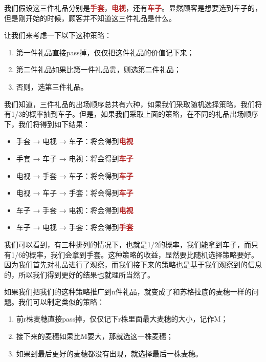 \documentclass[12pt, letterpaper]{ctexrep}
\begin{document}
我们假设这三件礼品分别是\textbf{\textcolor{Firebrick}{手套}}，\textbf{\textcolor{Firebrick}{电视}}，还有\textbf{\textcolor{Firebrick}{车子}}。显然顾客是想要选到车子的，但是刚开始的时候，顾客并不知道这三件礼品是什么。

让我们来考虑一下以下这种策略：

\begin{enumerate}
\item{ 第一件礼品直接pass掉，仅仅把这件礼品的价值记下来； }
\item{ 第二件礼品如果比第一件礼品贵，则选第二件礼品； }
\item{ 否则，选第三件礼品。 }
\end{enumerate}


我们知道，三件礼品的出场顺序总共有六种，如果我们采取随机选择策略，我们将有1/3的概率抽到车子。但是，如果我们采取上面的策略，在不同的礼品出场顺序下，我们将得到如下结果：


\begin{itemize}
\item{ 手套 → 电视 → 车子：将会得到\textbf{\textcolor{Firebrick}{电视}} }
\item{ 手套 → 车子 → 电视：将会得到\textbf{\textcolor{Firebrick}{车子}} }
\item{ 电视 → 手套 → 车子：将会得到\textbf{\textcolor{Firebrick}{车子}} }
\item{ 电视 → 车子 → 手套：将会得到\textbf{\textcolor{Firebrick}{车子}} }
\item{ 车子 → 手套 → 电视：将会得到\textbf{\textcolor{Firebrick}{电视}} }
\item{ 车子 → 电视 → 手套：将会得到\textbf{\textcolor{Firebrick}{手套}} }
\end{itemize}


我们可以看到，有三种排列的情况下，也就是1/2的概率，我们能拿到车子，而只有1/6的概率，我们会拿到手套。这种策略的收益，显然要比随机选择策略要好。因为我们首先对礼品进行了观察，而我们接下来的策略也是基于我们观察到的信息的，所以我们得到更好的结果也就理所当然了。

如果我们把我们的这种策略推广到n件礼品，就变成了和苏格拉底的麦穗一样的问题。我们可以制定类似的策略：

\begin{enumerate}
\item{ 前r株麦穗直接pass掉，仅仅记下r株里面最大麦穗的大小，记作M； }
\item{ 接下来的麦穗如果比M要大，那就选这一株麦穗； }
\item{ 如果到最后更好的麦穗都没有出现，就选择最后一株麦穗。 }
\end{enumerate}
\end{document}
